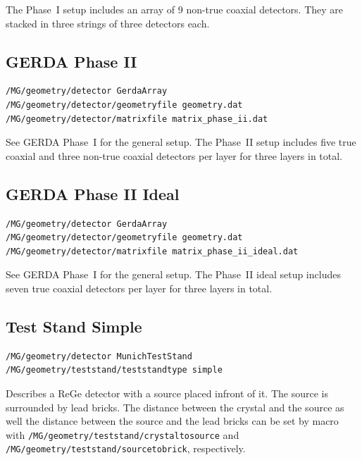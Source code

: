 The Phase~I setup includes an array of 9 non-true coaxial
detectors. They are stacked in three strings of three detectors each.

\subsection{GERDA Phase II}
\begin{lstlisting}
/MG/geometry/detector GerdaArray
/MG/geometry/detector/geometryfile geometry.dat
/MG/geometry/detector/matrixfile matrix_phase_ii.dat
\end{lstlisting}

See GERDA Phase~I for the general setup. The Phase~II setup includes
five true coaxial and three non-true coaxial detectors per layer for
three layers in total. 

\subsection{GERDA Phase II Ideal}
\begin{lstlisting}
/MG/geometry/detector GerdaArray
/MG/geometry/detector/geometryfile geometry.dat
/MG/geometry/detector/matrixfile matrix_phase_ii_ideal.dat
\end{lstlisting}

See GERDA Phase~I for the general setup. The Phase~II ideal setup
includes seven true coaxial detectors per layer for three layers in
total.

\subsection{Test Stand Simple}
\begin{lstlisting}
/MG/geometry/detector MunichTestStand
/MG/geometry/teststand/teststandtype simple
\end{lstlisting}

Describes a ReGe detector with a source placed infront of it. The
source is surrounded by lead bricks. The distance between the crystal
and the source as well the distance between the source and the lead
bricks can be set by macro with
\verb*|/MG/geometry/teststand/crystaltosource| and
\verb*|/MG/geometry/teststand/sourcetobrick|, respectively. 


